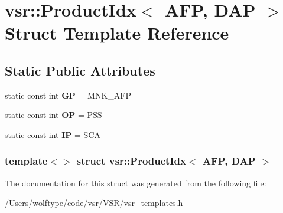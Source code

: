 \hypertarget{structvsr_1_1_product_idx_3_01_a_f_p_00_01_d_a_p_01_4}{\section{vsr\-:\-:Product\-Idx$<$ A\-F\-P, D\-A\-P $>$ Struct Template Reference}
\label{structvsr_1_1_product_idx_3_01_a_f_p_00_01_d_a_p_01_4}
}
\subsection*{Static Public Attributes}
\begin{DoxyCompactItemize}
\item 
\hypertarget{structvsr_1_1_product_idx_3_01_a_f_p_00_01_d_a_p_01_4_a1f76eef0b958a701e3d65cbd27b958ef}{static const int {\bfseries G\-P} = M\-N\-K\-\_\-\-A\-F\-P}\label{structvsr_1_1_product_idx_3_01_a_f_p_00_01_d_a_p_01_4_a1f76eef0b958a701e3d65cbd27b958ef}

\item 
\hypertarget{structvsr_1_1_product_idx_3_01_a_f_p_00_01_d_a_p_01_4_a2c4dc7f34c2fa61387b480501b4f8688}{static const int {\bfseries O\-P} = P\-S\-S}\label{structvsr_1_1_product_idx_3_01_a_f_p_00_01_d_a_p_01_4_a2c4dc7f34c2fa61387b480501b4f8688}

\item 
\hypertarget{structvsr_1_1_product_idx_3_01_a_f_p_00_01_d_a_p_01_4_aac80573efc0cf31a07a63d679df3cd6e}{static const int {\bfseries I\-P} = S\-C\-A}\label{structvsr_1_1_product_idx_3_01_a_f_p_00_01_d_a_p_01_4_aac80573efc0cf31a07a63d679df3cd6e}

\end{DoxyCompactItemize}
\subsubsection*{template$<$$>$ struct vsr\-::\-Product\-Idx$<$ A\-F\-P, D\-A\-P $>$}



The documentation for this struct was generated from the following file\-:\begin{DoxyCompactItemize}
\item 
/\-Users/wolftype/code/vsr/\-V\-S\-R/vsr\-\_\-templates.\-h\end{DoxyCompactItemize}
